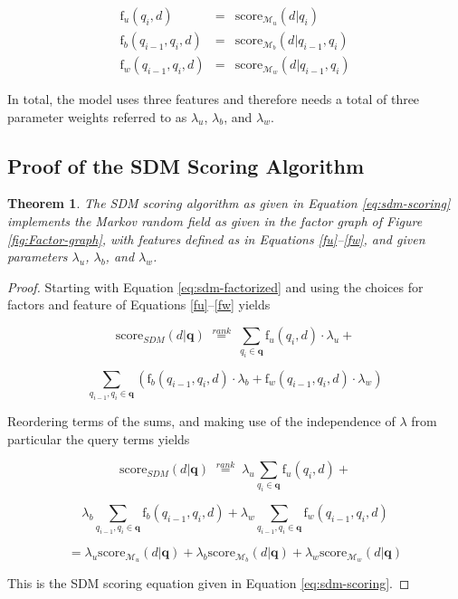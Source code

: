 \documentclass[]{article}
\newtheorem{theorem}{Theorem}
\begin{document}
\begin{eqnarray}
\mbox{f}_{u}(q_{i},d) & = & \mbox{score}_{\mathcal{M}_{u}}(d|q_{i})\label{fu}\\
\mbox{f}_{b}(q_{i-1},q_{i},d) & = & \mbox{score}_{\mathcal{M}_{b}}(d|q_{i-1},q_{i})\label{fb}\\
\mbox{f}_{w}(q_{i-1},q_{i},d) & = & \mbox{score}_{\mathcal{M}_{w}}(d|q_{i-1},q_{i})\label{fw}
\end{eqnarray}

In total, the model uses three features and therefore needs a total
of three parameter weights referred to as $\lambda_{u}$, $\lambda_{b}$,
and $\lambda_{w}$. 

\subsection{Proof of the SDM Scoring Algorithm}

\begin{theorem} The SDM scoring algorithm as given in Equation \ref{eq:sdm-scoring}
implements the Markov random field as given in the factor graph of
Figure \ref{fig:Factor-graph}, with features defined as in Equations
\ref{fu}–\ref{fw}, and given parameters $\lambda_{u}$, $\lambda_{b}$,
and $\lambda_{w}$.

\end{theorem}%

\begin{proof}

Starting with Equation \ref{eq:sdm-factorized} and using the choices
for factors and feature of Equations \ref{fu}–\ref{fw} yields

\[
\mbox{score}_{SDM}(d|\mathbf{q})\; \stackrel{rank}{=} \; \sum_{q_{i}\in\mathbf{q}}\mbox{f}_{u}(q_{i},d)\cdot\lambda_{u}+
\]


\[
\sum_{q_{i-1},q_{i}\in\mathbf{q}}\left(\mbox{f}_{b}(q_{i-1},q_{i},d)\cdot\lambda_{b}+\mbox{f}_{w}(q_{i-1},q_{i},d)\cdot\lambda_{w}\right)
\]

Reordering terms of the sums, and making use of the independence of
$\lambda$ from particular the query terms yields 

\[
\mbox{score}_{SDM}(d|\mathbf{q})\; \stackrel{rank}{=} \; \lambda_{u}\sum_{q_{i}\in\mathbf{q}}\mbox{f}_{u}(q_{i},d)+
\]

\[
\lambda_{b}\sum_{q_{i-1},q_{i}\in\mathbf{q}}\mbox{f}_{b}(q_{i-1},q_{i},d)+\lambda_{w}\sum_{q_{i-1},q_{i}\in\mathbf{q}}\mbox{f}_{w}(q_{i-1},q_{i},d)
\]


\begin{equation}
=\lambda_{u}\mbox{score}_{\mathcal{M}_{u}}(d|\mathbf{q})+\lambda_{b}\mbox{score}_{\mathcal{M}_{b}}(d|\mathbf{q})+\lambda_{w}\mbox{score}_{\mathcal{M}_{w}}(d|\mathbf{q})\label{eq:sdm-final}
\end{equation}

This is the SDM scoring equation given in Equation \ref{eq:sdm-scoring}.
\end{proof}
\end{document}
